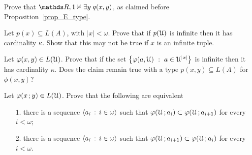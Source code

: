 \documentclass[creche.tex]{subfiles}
\begin{document}
\begin{exercise}\label{ex_E_type}
Prove that $\RR,1\notmodels\E y\;q(x,y)$, as claimed before Proposition~\ref{prop_E_type}.\QED
\end{exercise}

\begin{exercise}\label{cadinalitafinitasaturazione}
Let $p(x)\subseteq L(A)$, with $|x|<\omega$. 
Prove that if $p(\EuScript U)$ is infinite then it has cardinality $\kappa$. 
Show that this may not be true if $x$ is an infinite tuple.\QED 
\end{exercise}

\begin{exercise}\label{cadinalitafinitasaturazioneinsiemi}
Let $\varphi(x,y)\in L(\EuScript U)$. Prove that if the set $\big\{\phi(a,\U)\ :\ a\in\U^{|x|}\big\}$ is infinite then it has cardinality $\kappa$.
Does the claim remain true with a type $p(x,y)\subseteq L(A)$ for $\phi(x,y)$?\QED 
\end{exercise}

\begin{exercise} 
Let $\varphi(x\,;y)\in L(\EuScript U)$. Prove that the following are equivalent
\begin{itemize}
\item[1.] there is a sequence $\langle a_i\,:\,i\in\omega\rangle$ such that $\varphi(\EuScript U\,;a_i)\subset\varphi(\EuScript U\,;a_{i+1})$ for every $i<\omega$;
\item[2.] there is a sequence $\langle a_i\,:\,i\in\omega\rangle$ such that $\varphi(\EuScript U\,;a_{i+1})\subset\varphi(\EuScript U\,;a_i)$ for every $i<\omega$.\QED  
\end{itemize}
\end{exercise}
\end{document}
